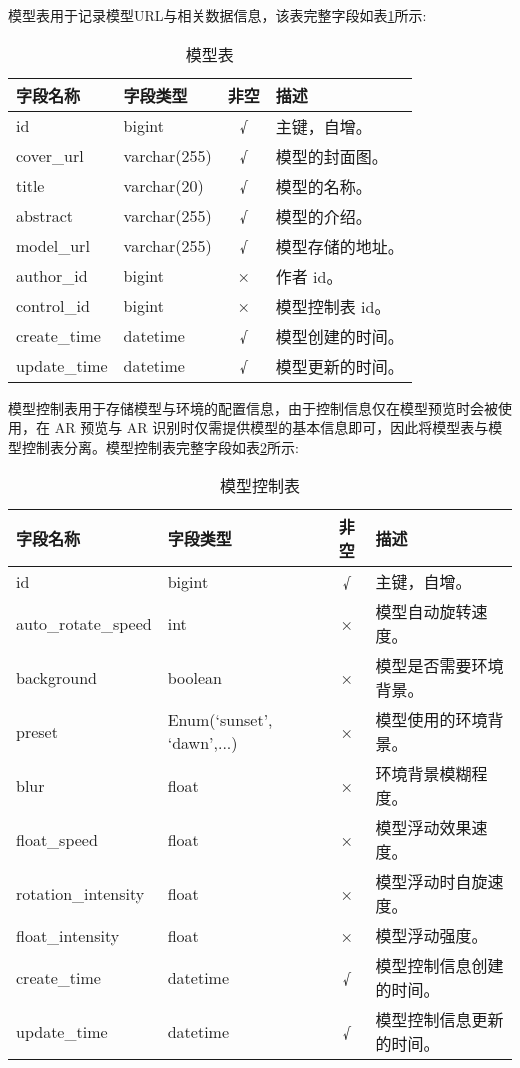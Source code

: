 模型表用于记录模型URL与相关数据信息，该表完整字段如表\ref{table:模型表}所示:

\begin{table}[H]
  \centering
  \small
  \caption{模型表}
  \label{table:模型表}
  \setlength{\tabcolsep}{11mm}
  \begin{tabular}{l|l|c|l}
    \toprule
    \textbf{字段名称} & \textbf{字段类型} & \textbf{非空} & \textbf{描述} \\
    \midrule
    id & bigint & √ & 主键，自增。 \\
    cover\_url & varchar(255) & √ & 模型的封面图。 \\
    title & varchar(20) & √ & 模型的名称。 \\
    abstract & varchar(255) & √ & 模型的介绍。 \\
    model\_url & varchar(255) & √ & 模型存储的地址。 \\
    author\_id & bigint & × & 作者 id。 \\
    control\_id & bigint & × & 模型控制表 id。 \\
    create\_time & datetime & √ & 模型创建的时间。 \\
    update\_time & datetime & √ & 模型更新的时间。 \\
    \bottomrule
  \end{tabular}
\end{table}

模型控制表用于存储模型与环境的配置信息，由于控制信息仅在模型预览时会被使用，在 AR 预览与 AR 识别时仅需提供模型的基本信息即可，因此将模型表与模型控制表分离。模型控制表完整字段如表\ref{table:模型控制表}所示:

\begin{table}[H]
  \centering
  \small
  \caption{模型控制表}
  \label{table:模型控制表}
  \setlength{\tabcolsep}{6.3mm}
  \begin{tabular}{l|l|c|l}
    \toprule
    \textbf{字段名称} & \textbf{字段类型} & \textbf{非空} & \textbf{描述} \\
    \midrule
    id & bigint & √ & 主键，自增。 \\
    auto\_rotate\_speed & int & × & 模型自动旋转速度。 \\
    background & boolean & × & 模型是否需要环境背景。 \\
    preset & Enum(`sunset', `dawn',...) & × & 模型使用的环境背景。 \\
    blur & float & × & 环境背景模糊程度。 \\
    float\_speed & float & × & 模型浮动效果速度。 \\
    rotation\_intensity & float & × & 模型浮动时自旋速度。 \\
    float\_intensity & float & × & 模型浮动强度。 \\
    create\_time & datetime & √ & 模型控制信息创建的时间。 \\
    update\_time & datetime & √ & 模型控制信息更新的时间。 \\
    \bottomrule
  \end{tabular}
\end{table}

